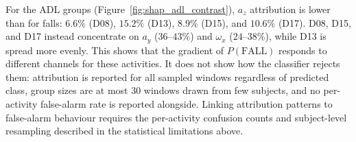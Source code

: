 For the ADL groups (Figure~\ref{fig:shap_adl_contrast}), $a_z$ attribution is lower than for falls: $6.6\%$ (D08), $15.2\%$ (D13), $8.9\%$ (D15), and $10.6\%$ (D17). D08, D15, and D17 instead concentrate on $a_y$ ($36$--$43\%$) and $\omega_x$ ($24$--$38\%$), while D13 is spread more evenly. This shows that the gradient of $P(\mathrm{FALL})$ responds to different channels for these activities. It does not show how the classifier rejects them: attribution is reported for all sampled windows regardless of predicted class, group sizes are at most 30 windows drawn from few subjects, and no per-activity false-alarm rate is reported alongside. Linking attribution patterns to false-alarm behaviour requires the per-activity confusion counts and subject-level resampling described in the statistical limitations above.
